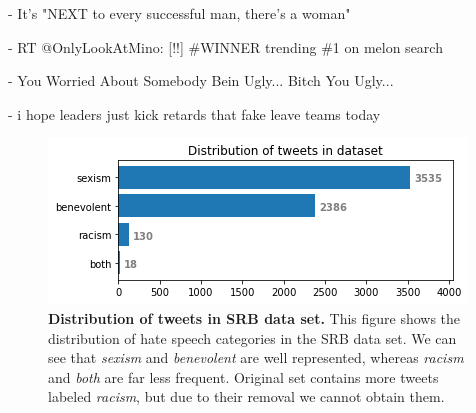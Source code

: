 \documentclass[fleqn,moreauthors,10pt]{ds_report}
\newcommand\bm{0.2pt}
\begin{document}
\begin{tcolorbox}[colback=black!8, width=0.9\linewidth, center,arc=8pt,sharp corners=downhill, boxrule=0.3pt, left=\bm, top=\bm, right=\bm, bottom=\bm, fontupper=\small]
 - It's "NEXT to every successful man, there's a woman"
\end{tcolorbox}

\begin{tcolorbox}[width=0.9\linewidth, center,arc=8pt,sharp corners=downhill, boxrule=0.3pt, left=\bm, top=\bm, right=\bm, bottom=\bm, fontupper=\small]
 - RT @OnlyLookAtMino: [!!] \#WINNER trending \#1 on melon search
\end{tcolorbox}

\begin{tcolorbox}[width=0.9\linewidth, center,arc=8pt,sharp corners=downhill, boxrule=0.3pt, left=\bm, top=\bm, right=\bm, bottom=\bm, fontupper=\small]
 - You Worried About Somebody Bein Ugly... Bitch You Ugly...
\end{tcolorbox}

\begin{tcolorbox}[width=0.9\linewidth, center,arc=8pt,sharp corners=downhill, boxrule=0.3pt, left=\bm, top=\bm, right=\bm, bottom=\bm, fontupper=\small]
 - i hope leaders just kick retards that fake leave teams today
\end{tcolorbox}

\begin{figure}[ht]\centering
	\includegraphics[width=\linewidth]{distribution_tweets_dataset1.png}
	\caption{\textbf{Distribution of tweets in SRB data set.} This figure shows the distribution of hate speech categories in the SRB data set. We can see that \textit{sexism} and \textit{benevolent} are well represented, whereas \textit{racism} and \textit{both} are far less frequent. Original set contains more tweets labeled \textit{racism}, but due to their removal we cannot obtain them.}
	\label{fig:distribution_tweets_dataset1}
\end{figure}
\end{document}
